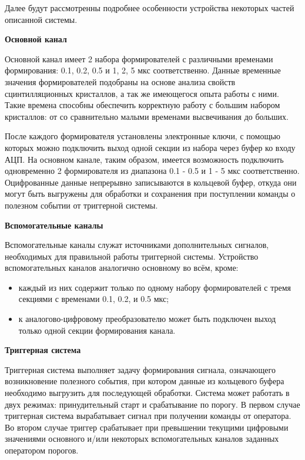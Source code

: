 Далее будут рассмотренны подробнее особенности устройства некоторых частей описанной системы.\par
\textbf{Основной канал}\par
Основной канал имеет 2 набора формирователей с различными временами формирования: 0.1, 0.2, 0.5 и 1, 2, 5 мкс соответственно. Данные временные значения формирователей подобраны на основе анализа свойств сцинтилляционных кристаллов, а так же имеющегося опыта работы с ними. Такие времена способны обеспечить корректную работу с большим набором кристаллов: от со сравнительно малыми временами высвечивания до больших.\par
После каждого формирователя установлены электронные ключи, с помощью которых можно подключить выход одной секции из набора через буфер ко входу АЦП. На основном канале, таким образом, имеется возможность подключить одновременно 2 формирователя из диапазона 0.1 - 0.5 и 1 - 5 мкс соответственно. Оцифрованные данные непрерывно записываются в кольцевой буфер, откуда они могут быть выгружены для обработки и сохранения при поступлении команды о полезном событии от триггерной системы.\par
\textbf{Вспомогательные каналы}\par
Вспомогательные каналы служат источниками дополнительных сигналов, необходимых для правильной работы триггерной системы. Устройство вспомогательных каналов аналогично основному во всём, кроме:\par
\begin{itemize}
    \item каждый из них содержит только по одному набору формирователей с тремя секциями с временами 0.1, 0.2, и 0.5 мкс;
    \item к аналогово-цифровому преобразователю может быть подключен выход только одной секции формирования канала.
\end{itemize}\par
\textbf{Триггерная система}\par
Триггерная система выполняет задачу формирования сигнала, означающего возникновение полезного события, при котором данные из кольцевого буфера необходимо выгрузить для последующей обработки. Система может работать в двух режимах: принудительный старт и срабатывание по порогу. В первом случае триггерная система вырабатывает сигнал при получении команды от оператора. Во втором случае триггер срабатывает при превышении текущими цифровыми значениями основного и/или некоторых вспомогательных каналов заданных оператором порогов.
